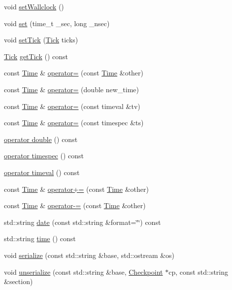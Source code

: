 \begin{DoxyCompactItemize}
\item 
void \hyperlink{classTime_a051b6ee80d523f5cf1fda569ab9261c3}{setWallclock} ()
\item 
void \hyperlink{classTime_a9e8f376bec3e8d15078a9024b0b7e522}{set} (time\_\-t \_\-sec, long \_\-nsec)
\item 
void \hyperlink{classTime_ae71f267ec8d0248b503d266434953239}{setTick} (\hyperlink{base_2types_8hh_a5c8ed81b7d238c9083e1037ba6d61643}{Tick} ticks)
\item 
\hyperlink{base_2types_8hh_a5c8ed81b7d238c9083e1037ba6d61643}{Tick} \hyperlink{classTime_a972aab5d67a4da04633746972803d5d6}{getTick} () const 
\item 
const \hyperlink{classTime}{Time} \& \hyperlink{classTime_a2342dc0583b5a80a244384a8a1e7f19e}{operator=} (const \hyperlink{classTime}{Time} \&other)
\item 
const \hyperlink{classTime}{Time} \& \hyperlink{classTime_a5ff73453339e093cb1b66366e19fad23}{operator=} (double new\_\-time)
\item 
const \hyperlink{classTime}{Time} \& \hyperlink{classTime_a00647d918479df3a472753197e8867d3}{operator=} (const timeval \&tv)
\item 
const \hyperlink{classTime}{Time} \& \hyperlink{classTime_ae4bb08a6674a58ebc62739623789e5ae}{operator=} (const timespec \&ts)
\item 
\hyperlink{classTime_a5665dbc337111463ad23d3dba99f7ce3}{operator double} () const 
\item 
\hyperlink{classTime_a7adea83ab904e5791837f80ec8f9d43e}{operator timespec} () const 
\item 
\hyperlink{classTime_ae05f06dc99bbbc25e3353503b68b28ed}{operator timeval} () const 
\item 
const \hyperlink{classTime}{Time} \& \hyperlink{classTime_abbcc50aa6a80eb89caebd1adc670a4b4}{operator+=} (const \hyperlink{classTime}{Time} \&other)
\item 
const \hyperlink{classTime}{Time} \& \hyperlink{classTime_ab8c305be453d8ac1de1ca0e63e432e23}{operator-\/=} (const \hyperlink{classTime}{Time} \&other)
\item 
std::string \hyperlink{classTime_a5cda3e393670b2c214e69d679bab0443}{date} (const std::string \&format=\char`\"{}\char`\"{}) const 
\item 
std::string \hyperlink{classTime_a08e4ae793506a998369618967d5cc2d2}{time} () const 
\item 
void \hyperlink{classTime_ab4138b21b48e3371a8e20df72b675a88}{serialize} (const std::string \&base, std::ostream \&os)
\item 
void \hyperlink{classTime_a147c320e3d6506edf5587a40cd8e430d}{unserialize} (const std::string \&base, \hyperlink{classCheckpoint}{Checkpoint} $\ast$cp, const std::string \&section)
\end{DoxyCompactItemize}
